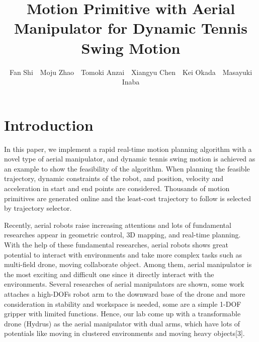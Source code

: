 \documentclass{jarticle}
\begin{document}
\title{Motion Primitive with Aerial Manipulator for Dynamic Tennis Swing Motion}
\author{Fan Shi\ \ Moju Zhao\ \ Tomoki Anzai\ \ Xiangyu Chen\ \ Kei Okada\ \ Masayuki Inaba}

\setlength{\baselineskip}{4.4mm}
\maketitle
\thispagestyle{empty}
\pagestyle{empty}

\section{Introduction}

In this paper, we implement a rapid real-time motion planning algorithm with a novel type of aerial manipulator, and dynamic tennis swing motion is achieved as an example to show the feasibility of the algorithm. When planning the feasible trajectory, dynamic constraints of the robot, and position, velocity and acceleration in start and end points are considered. Thousands of motion primitives are generated online and the least-cost trajectory to follow is selected by trajectory selector.


Recently, aerial robots raise increasing attentions and lots of fundamental researches appear in geometric control, 3D mapping,  and real-time planning. With the help of these fundamental researches, aerial robots shows great potential to interact with environments and take more complex tasks such as multi-field drone, moving collaborate object. Among them, aerial manipulator is the most exciting and difficult one since it directly interact with the environments. Several researches of aerial manipulators are shown, some work attaches a high-DOFs robot arm to the downward base of the drone and more consideration in stability and workspace is needed\cite{aerial_manipulator_1}, some are a simple 1-DOF gripper with limited functions. Hence, our lab come up with a transformable drone (Hydrus) as the aerial manipulator with dual arms, which have lots of potentials like moving in clustered environments and moving heavy objects[3].
\end{document}
